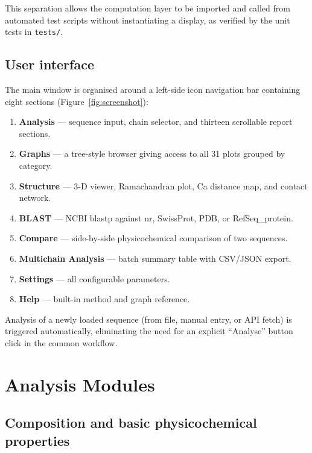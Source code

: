 \documentclass[12pt]{article}
\begin{document}
This separation allows the computation layer to be imported and called from
automated test scripts without instantiating a display, as verified by the
unit tests in \texttt{tests/}.

\subsection{User interface}

The main window is organised around a left-side icon navigation bar containing
eight sections (Figure~\ref{fig:screenshot}):

\begin{enumerate}[noitemsep]
  \item \textbf{Analysis} — sequence input, chain selector, and thirteen
        scrollable report sections.
  \item \textbf{Graphs} — a tree-style browser giving access to all 31 plots
        grouped by category.
  \item \textbf{Structure} — 3-D viewer, Ramachandran plot, Ca distance map,
        and contact network.
  \item \textbf{BLAST} — NCBI blastp against nr, SwissProt, PDB, or
        RefSeq\_protein.
  \item \textbf{Compare} — side-by-side physicochemical comparison of two
        sequences.
  \item \textbf{Multichain Analysis} — batch summary table with CSV/JSON
        export.
  \item \textbf{Settings} — all configurable parameters.
  \item \textbf{Help} — built-in method and graph reference.
\end{enumerate}

Analysis of a newly loaded sequence (from file, manual entry, or API fetch)
is triggered automatically, eliminating the need for an explicit ``Analyse''
button click in the common workflow.

\section{Analysis Modules}
\label{sec:modules}

\subsection{Composition and basic physicochemical properties}
\end{document}
